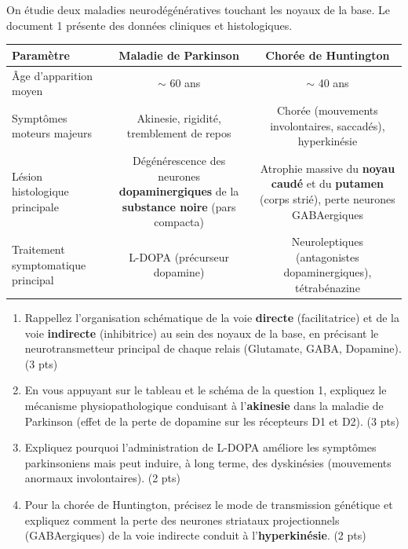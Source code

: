 \documentclass[11pt]{article}
\begin{document}
\begin{exercice}
On étudie deux maladies neurodégénératives touchant les noyaux de la base. Le document 1 présente des données cliniques et histologiques.
\begin{center}
\begin{tabular}{|l|c|c|}
\hline
\textbf{Paramètre} & \textbf{Maladie de Parkinson} & \textbf{Chorée de Huntington} \\
\hline
Âge d'apparition moyen & $\sim$ 60 ans & $\sim$ 40 ans \\
\hline
Symptômes moteurs majeurs & Akinesie, rigidité, tremblement de repos & Chorée (mouvements involontaires, saccadés), hyperkinésie \\
\hline
Lésion histologique principale & Dégénérescence des neurones \textbf{dopaminergiques} de la \textbf{substance noire} (pars compacta) & Atrophie massive du \textbf{noyau caudé} et du \textbf{putamen} (corps strié), perte neurones GABAergiques \\
\hline
Traitement symptomatique principal & L-DOPA (précurseur dopamine) & Neuroleptiques (antagonistes dopaminergiques), tétrabénazine \\
\hline
\end{tabular}
\end{center}
\begin{enumerate}
    \item Rappellez l'organisation schématique de la voie \textbf{directe} (facilitatrice) et de la voie \textbf{indirecte} (inhibitrice) au sein des noyaux de la base, en précisant le neurotransmetteur principal de chaque relais (Glutamate, GABA, Dopamine). (3 pts)
    \item En vous appuyant sur le tableau et le schéma de la question 1, expliquez le mécanisme physiopathologique conduisant à l'\textbf{akinesie} dans la maladie de Parkinson (effet de la perte de dopamine sur les récepteurs D1 et D2). (3 pts)
    \item Expliquez pourquoi l'administration de L-DOPA améliore les symptômes parkinsoniens mais peut induire, à long terme, des dyskinésies (mouvements anormaux involontaires). (2 pts)
    \item Pour la chorée de Huntington, précisez le mode de transmission génétique et expliquez comment la perte des neurones striataux projectionnels (GABAergiques) de la voie indirecte conduit à l'\textbf{hyperkinésie}. (2 pts)
\end{enumerate}
\end{exercice}
\end{document}

